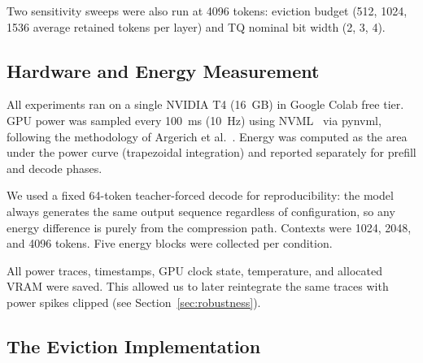 \documentclass[sigconf,nonacm]{acmart}
\begin{document}
\begin{table}[htbp]
\caption{Five Core Compression Configurations}
\label{tab:configs}
\centering\small
{}
\end{table}

Two sensitivity sweeps were also run at 4096 tokens: eviction budget (512, 1024,
1536 average retained tokens per layer) and TQ nominal bit width (2, 3, 4).

\subsection{Hardware and Energy Measurement}

All experiments ran on a single NVIDIA T4 (16~GB) in Google Colab free tier.
GPU power was sampled every 100~ms (10~Hz) using NVML~\cite{nvidia2024nvml} via pynvml, following the
methodology of Argerich et al.~\cite{argerich_watt_2026}. Energy was computed as
the area under the power curve (trapezoidal integration) and reported separately
for prefill and decode phases.

We used a fixed 64-token teacher-forced decode for reproducibility: the model
always generates the same output sequence regardless of configuration, so any
energy difference is purely from the compression path. Contexts were 1024, 2048,
and 4096 tokens. Five energy blocks were collected per condition.

All power traces, timestamps, GPU clock state, temperature, and allocated VRAM
were saved. This allowed us to later reintegrate the same traces with power
spikes clipped (see Section~\ref{sec:robustness}).

\subsection{The Eviction Implementation}
\end{document}
